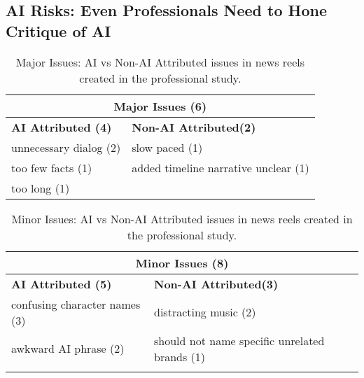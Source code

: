 \subsection{AI Risks: Even Professionals Need to Hone Critique of AI}

\begin{table}
\centering
\begin{adjustbox}{width=0.46\textwidth}
\begin{tabular}{|l|l|}
\hline
\multicolumn{2}{|c|}{\textbf{Major Issues (6)}} \\ \hline
\textbf{AI Attributed (4)}          & \textbf{Non-AI Attributed(2)}                  \\ \hline
unnecessary dialog (2)                & slow paced (1)                  \\ 
too few facts (1)                    &  added timeline narrative unclear (1)                 \\ 
too long (1)              &      \\ 

\hline
\end{tabular}
\end{adjustbox}
\caption{Major Issues: AI vs Non-AI Attributed issues in news reels created in the professional study.}
\label{pro_major_issues}
\end{table}


\begin{table}
\centering
\begin{adjustbox}{width=0.47\textwidth}
\begin{tabular}{|l|l|}
\hline
\multicolumn{2}{|c|}{\textbf{Minor Issues (8)}} \\ \hline
\textbf{AI Attributed (5)}          & \textbf{Non-AI Attributed(3)}                  \\ \hline
confusing character names (3)                &     distracting music (2)                \\ 
awkward AI phrase (2)                    &  should not name specific unrelated brands (1)                \\ 
              &      \\ 

\hline
\end{tabular}
\end{adjustbox}
\caption{Minor Issues: AI vs Non-AI Attributed issues in news reels created in the professional study.}
\label{pro_minor_issues}
\end{table}


